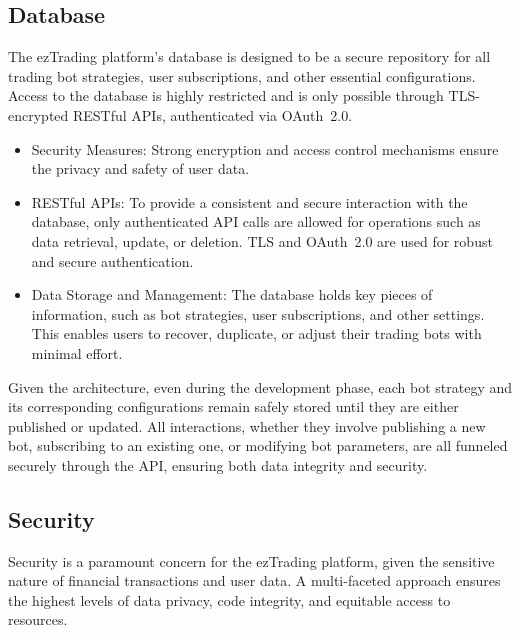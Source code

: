 \subsection{Database}
\label{subsec:database}

The ezTrading platform's database is designed to be a secure repository for all trading bot strategies, user subscriptions, and other essential configurations. Access to the database is highly restricted and is only possible through TLS-encrypted RESTful APIs, authenticated via OAuth~2.0.

\begin{itemize}
  \item Security Measures: Strong encryption and access control mechanisms ensure the privacy and safety of user data.
  \item RESTful APIs: To provide a consistent and secure interaction with the database, only authenticated API calls are allowed for operations such as data retrieval, update, or deletion. TLS and OAuth~2.0 are used for robust and secure authentication.
  \item Data Storage and Management: The database holds key pieces of information, such as bot strategies, user subscriptions, and other settings. This enables users to recover, duplicate, or adjust their trading bots with minimal effort.
\end{itemize}

Given the architecture, even during the development phase, each bot strategy and its corresponding configurations remain safely stored until they are either published or updated. All interactions, whether they involve publishing a new bot, subscribing to an existing one, or modifying bot parameters, are all funneled securely through the API, ensuring both data integrity and security.


\subsection{Security}
\label{subsec:security}

Security is a paramount concern for the ezTrading platform, given the sensitive nature of financial transactions and user data. A multi-faceted approach ensures the highest levels of data privacy, code integrity, and equitable access to resources.


